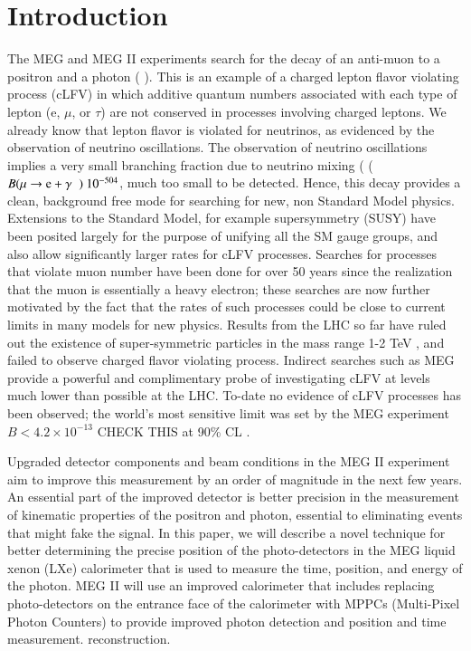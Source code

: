 \section{\label{intro}Introduction}
The MEG \cite{megexperiment} and MEG II\cite{meg2experiment} experiments search for the decay of an anti-muon to a positron and a photon ( \mueg ). This is an example of a charged lepton flavor violating
process (cLFV) in which additive quantum numbers associated with each type of lepton (e, $\mu$, or $\tau$) are not conserved in processes involving charged leptons. We already know that lepton flavor is violated for neutrinos, as evidenced by the observation of neutrino oscillations. The observation of neutrino oscillations implies a very small \mueg branching fraction due to neutrino mixing ( ($B(\mathrm{\mu \rightarrow e + \gamma\hspace{2 mm}}) ~ 10^{-504}$, much too small to be detected. Hence, this decay provides a clean, background free mode for
searching for new, non Standard Model physics.  Extensions to the
Standard Model, for example supersymmetry (SUSY) have been posited largely for the purpose of unifying all the SM
gauge groups, and also allow significantly larger rates for cLFV processes. Searches for processes that violate muon number have been done for over 50 years since the realization that the muon is essentially a heavy electron; these searches are now further motivated by the fact that the rates of such processes could be close to current limits in many models for new physics. Results from the LHC so far have ruled out the
existence of super-symmetric particles in the mass range 1-2 TeV
\cite{lhcsusy1,lhcsusy2}, and failed to observe charged flavor violating
process\cite{lhcclfv1,lhcclfv2}. Indirect searches such as MEG provide a
powerful and complimentary probe of investigating cLFV at levels much lower than possible at the LHC.  To-date no
evidence of cLFV processes has been observed; the world’s most sensitive limit was set
by the MEG experiment $B < 4.2 \times 10^{-13}$ CHECK THIS at 90\% CL \cite{meg1result}.

Upgraded detector components and beam conditions in the MEG II
experiment aim to improve this measurement by an order of magnitude in
the next few years. An essential part of the improved detector is better precision in the measurement of kinematic properties of the positron and photon, essential to eliminating events that might fake the signal.  
In this paper, we will describe a novel technique for better determining the precise position of the photo-detectors in the MEG liquid xenon (LXe) calorimeter that is used to measure the time, position, and energy of the photon. MEG II will use an improved calorimeter that includes replacing photo-detectors on the entrance face of the calorimeter with MPPCs (Multi-Pixel Photon Counters) to provide improved photon detection and position and time measurement. 
reconstruction.  

